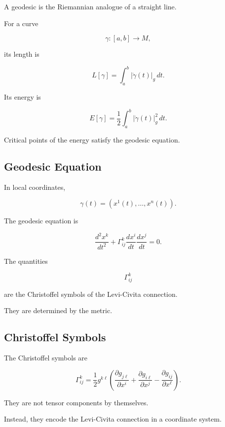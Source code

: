 A geodesic is the Riemannian analogue of a straight line.

For a curve

\[
\gamma:[a,b]\to M,
\]

its length is

\[
\boxed{
L[\gamma]
=
\int_a^b
|\dot{\gamma}(t)|_g
\,dt.
}
\]

Its energy is

\[
\boxed{
E[\gamma]
=
\frac12
\int_a^b
|\dot{\gamma}(t)|_g^2
\,dt.
}
\]

Critical points of the energy satisfy the geodesic equation.

\subsection{Geodesic Equation}
\label{subsec:geodesic-equation-analysis}

In local coordinates,

\[
\gamma(t)
=
\left(
x^1(t),\ldots,x^n(t)
\right).
\]

The geodesic equation is

\[
\boxed{
\frac{d^2x^k}{dt^2}
+
\Gamma^k_{ij}
\frac{dx^i}{dt}
\frac{dx^j}{dt}
=
0.
}
\]

The quantities

\[
\Gamma^k_{ij}
\]

are the Christoffel symbols of the Levi-Civita connection.

They are determined by the metric.

\subsection{Christoffel Symbols}
\label{subsec:christoffel-symbols-analysis}

The Christoffel symbols are

\[
\boxed{
\Gamma^k_{ij}
=
\frac12
g^{k\ell}
\left(
\frac{\partial g_{j\ell}}{\partial x^i}
+
\frac{\partial g_{i\ell}}{\partial x^j}
-
\frac{\partial g_{ij}}{\partial x^\ell}
\right).
}
\]

They are not tensor components by themselves.

Instead, they encode the Levi-Civita connection in a coordinate system.

